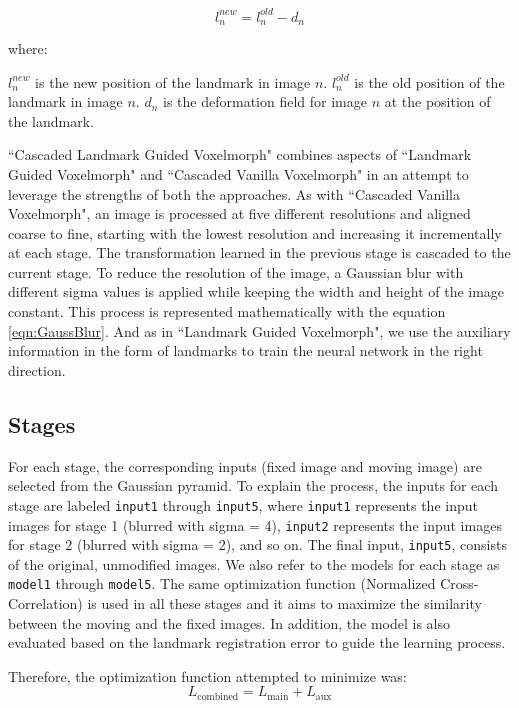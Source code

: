 \documentclass{book}
\begin{document}
	\begin{equation}\label{eq:ldm_prop}
		l_n^{new} = l_n^{old} - d_n
	\end{equation}
	
	where:
	
	$l_n^{new}$ is the new position of the landmark in image $n$. $l_n^{old}$ is the old position of the landmark in image $n$. $d_n$ is the deformation field for image $n$ at the position of the landmark.
	
	``Cascaded Landmark Guided Voxelmorph" combines aspects of ``Landmark Guided Voxelmorph" and ``Cascaded Vanilla Voxelmorph" in an attempt to leverage the strengths of both the approaches. As with ``Cascaded Vanilla Voxelmorph", an image is processed at five different resolutions and aligned coarse to fine, starting with the lowest resolution and increasing it incrementally at each stage. The transformation learned in the previous stage is cascaded to the current stage. To reduce the resolution of the image, a Gaussian blur with different sigma values is applied while keeping the width and height of the image constant. This process is represented mathematically with the equation \ref{eqn:GaussBlur}. And as in ``Landmark Guided Voxelmorph", we use the auxiliary information in the form of landmarks to train the neural network in the right direction.
	
	\subsection{Stages}
	For each stage, the corresponding inputs (fixed image and moving image) are selected from the Gaussian pyramid. To explain the process, the inputs for each stage are labeled \texttt{input1} through \texttt{input5}, where \texttt{input1} represents the input images for stage 1 (blurred with sigma = 4), \texttt{input2} represents the input images for stage 2 (blurred with sigma = 2), and so on. The final input, \texttt{input5}, consists of the original, unmodified images. We also refer to the models for each stage as \texttt{model1} through \texttt{model5}. The same optimization function (Normalized Cross-Correlation) is used in all these stages and it aims to maximize the similarity between the moving and the fixed images. In addition, the model is also evaluated based on the landmark registration error to guide the learning process.
	
	Therefore, the optimization function attempted to minimize was:
	\begin{equation}\label{eq:aux_loss_combined}
		L_\text{combined} = L_\text{main} + L_\text{aux}
	\end{equation}
	
\end{document}
